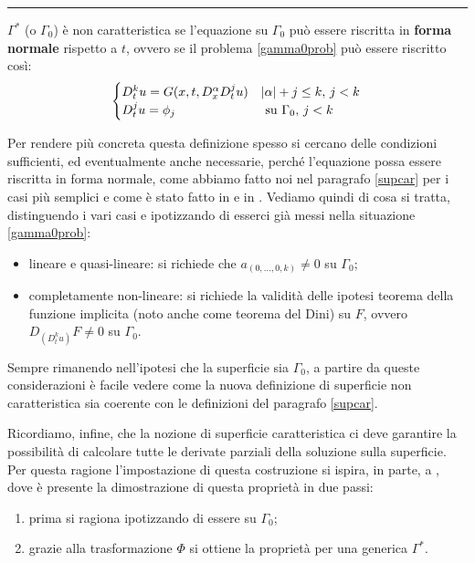 \noindent\rule[0.5ex]{\linewidth}{0.2pt}

\begin{definition}
$\Gamma^*$ (o $\Gamma_0$) è non caratteristica se l'equazione su $\Gamma_0$ può essere riscritta in \textbf{forma normale} rispetto a $t$, ovvero se il problema \eqref{gamma0prob} può essere riscritto così:
\begin{equation*}
\begin{cases}
D_{t}^k u = G(x,t, D^\alpha_x D^j_t u) & |\alpha |+ j \leq k, \, j<k \\
D_t^ju = \phi_j & \text{ su } \Gamma_0, \, j<k
\end{cases} \\
\end{equation*}
\end{definition}

Per rendere più concreta questa definizione spesso si cercano delle condizioni sufficienti, ed eventualmente anche necessarie, perché l'equazione possa essere riscritta in forma normale, come abbiamo fatto noi nel paragrafo \ref{supcar} per i casi più semplici e come è stato fatto in \cite{Evans} e in \cite{Folland}.
Vediamo quindi di cosa si tratta, distinguendo i vari casi e ipotizzando di esserci già messi nella situazione \eqref{gamma0prob}:
\begin{itemize}
\item lineare e quasi-lineare: si richiede che $a_{(0,\ldots ,0,k)} \neq 0$ su $\Gamma_0$;
\item completamente non-lineare: si richiede la validità delle ipotesi teorema della funzione implicita (noto anche come teorema del Dini) su $F$, ovvero $D_{(D^k_t u)} F \neq 0$ su $\Gamma_0$.
\end{itemize}

\begin{remark}
Sempre rimanendo nell'ipotesi che la superficie sia $\Gamma_0$, a partire da queste considerazioni è facile vedere come la nuova definizione di superficie non caratteristica sia coerente con le definizioni del paragrafo \ref{supcar}.
\end{remark}

Ricordiamo, infine, che la nozione di superficie caratteristica ci deve garantire la possibilità di calcolare tutte le derivate parziali della soluzione sulla superficie. Per questa ragione l'impostazione di questa costruzione si ispira, in parte, a \cite[cap.3]{Evans}, dove è presente la dimostrazione di questa proprietà in due passi:
\begin{enumerate}
\item prima si ragiona ipotizzando di essere su $\Gamma_0$;
\item grazie alla trasformazione $\Phi$ si ottiene la proprietà per una generica $\Gamma^*$.
\end{enumerate}


